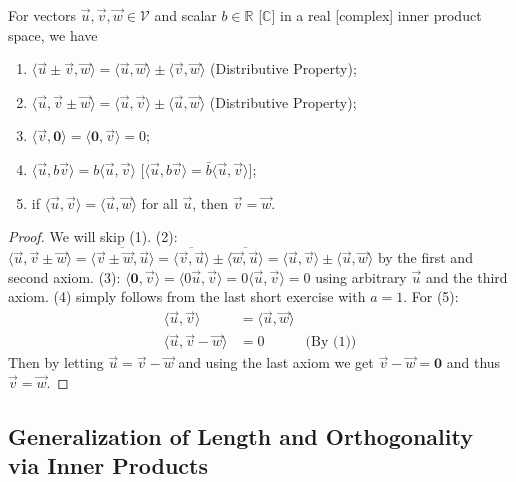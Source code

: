 \begin{proper}
\label{proper:innerprod2}
For vectors $\vec{u}, \vec{v}, \vec{w} \in \mathcal{V}$ and scalar $b \in \mathbb{R}$ [$\mathbb{C}$] in a real [complex] inner product space, we have
\begin{enumerate}
    \item $\langle \vec{u} \pm \vec{v}, \vec{w} \rangle = \langle \vec{u}, \vec{w} \rangle \pm \langle \vec{v}, \vec{w} \rangle$ (Distributive Property);
    \item $\langle \vec{u}, \vec{v} \pm \vec{w} \rangle = \langle \vec{u}, \vec{v} \rangle \pm \langle \vec{u}, \vec{w} \rangle$ (Distributive Property);
    \item $\langle \vec{v}, \textbf{0} \rangle = \langle \textbf{0}, \vec{v} \rangle = 0$;
    \item $\langle \vec{u}, b\vec{v} \rangle = b\langle \vec{u}, \vec{v} \rangle$ [$\langle \vec{u}, b\vec{v} \rangle = \bar{b}\langle \vec{u}, \vec{v} \rangle$];
    \item if $\langle \vec{u}, \vec{v} \rangle = \langle \vec{u}, \vec{w} \rangle$ for all $\vec{u}$, then $\vec{v} = \vec{w}$.
\end{enumerate}
\end{proper}
\begin{proof}
We will skip (1). (2): $\langle \vec{u}, \vec{v} \pm \vec{w} \rangle = \overline{\langle \vec{v} \pm \vec{w}, \vec{u} \rangle} = \overline{\langle \vec{v}, \vec{u} \rangle} \pm \overline{\langle \vec{w}, \vec{u} \rangle} = \langle \vec{u}, \vec{v} \rangle \pm \langle \vec{u}, \vec{w} \rangle$ by the first and second axiom. (3): $\langle \textbf{0}, \vec{v} \rangle = \langle 0\vec{u}, \vec{v} \rangle = 0\langle \vec{u}, \vec{v} \rangle = 0$ using arbitrary $\vec{u}$ and the third axiom. (4) simply follows from the last short exercise with $a = 1$. For (5):
\begin{align*}
\langle \vec{u}, \vec{v} \rangle &= \langle \vec{u}, \vec{w} \rangle \\
\langle \vec{u}, \vec{v} - \vec{w} \rangle &= 0 & \text{(By (1))}
\end{align*}
Then by letting $\vec{u} = \vec{v} - \vec{w}$ and using the last axiom we get $\vec{v} - \vec{w} = \textbf{0}$ and thus $\vec{v} = \vec{w}$.
\end{proof}

\subsection{Generalization of Length and Orthogonality via Inner Products}

